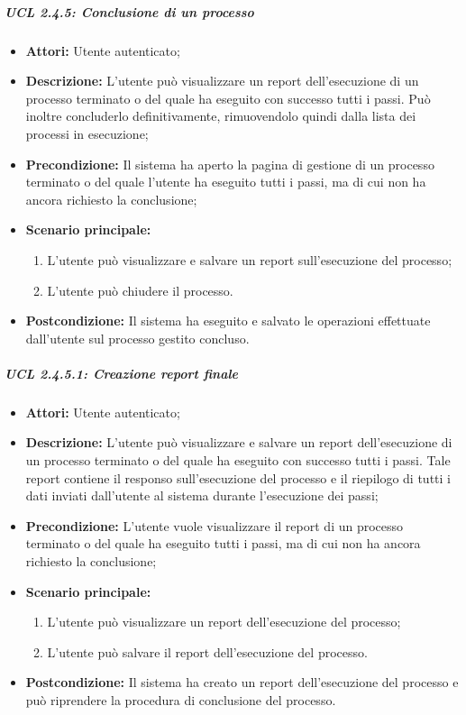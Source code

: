 \subparagraph{UCL 2.4.5: Conclusione di un processo}
\begin{itemize}
\item \textbf{Attori:} Utente autenticato;
\item \textbf{Descrizione:} L'utente può visualizzare un report dell'esecuzione di un processo terminato o del quale ha eseguito con successo tutti i passi. Può inoltre concluderlo definitivamente, rimuovendolo quindi dalla lista dei processi in esecuzione;
\item \textbf{Precondizione:} Il sistema ha aperto la pagina di gestione di un processo terminato o del quale l'utente ha eseguito tutti i passi, ma di cui non ha ancora richiesto la conclusione;
\item \textbf{Scenario principale:}
\begin{enumerate}
\item L'utente può visualizzare e salvare un report sull'esecuzione del processo;
\item L'utente può chiudere il processo.
\end{enumerate}
\item \textbf{Postcondizione:} Il sistema ha eseguito e salvato le operazioni effettuate dall'utente sul processo gestito concluso.
\end{itemize}

\subparagraph{UCL 2.4.5.1: Creazione report finale}
\begin{itemize}
\item \textbf{Attori:} Utente autenticato;
\item \textbf{Descrizione:} L'utente può visualizzare e salvare un report dell'esecuzione di un processo terminato o del quale ha eseguito con successo tutti i passi. Tale report contiene il responso sull'esecuzione del processo e il riepilogo di tutti i dati inviati dall'utente al sistema durante l'esecuzione dei passi;
\item \textbf{Precondizione:} L'utente vuole visualizzare il report di un processo terminato o del quale ha eseguito tutti i passi, ma di cui non ha ancora richiesto la conclusione;
\item \textbf{Scenario principale:}
\begin{enumerate}
\item L'utente può visualizzare un report dell'esecuzione del processo;
\item L'utente può salvare il report dell'esecuzione del processo.
\end{enumerate}
\item \textbf{Postcondizione:} Il sistema ha creato un report dell'esecuzione del processo e può riprendere la procedura di conclusione del processo.
\end{itemize}

